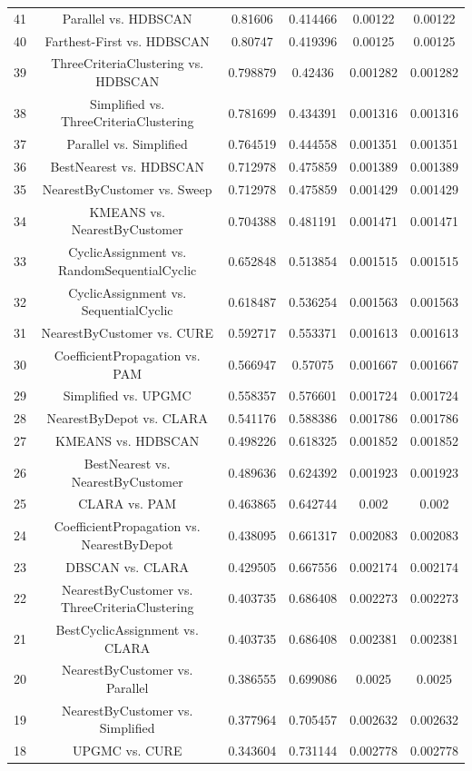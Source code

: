 \documentclass[a4paper,10pt]{article}
\begin{document}
\begin{landscape}
\begin{table}[!htp]
\begin{tabular}{cccccc}
41&Parallel vs. HDBSCAN&0.81606&0.414466&0.00122&0.00122\\
40&Farthest-First vs. HDBSCAN&0.80747&0.419396&0.00125&0.00125\\
39&ThreeCriteriaClustering vs. HDBSCAN&0.798879&0.42436&0.001282&0.001282\\
38&Simplified vs. ThreeCriteriaClustering&0.781699&0.434391&0.001316&0.001316\\
37&Parallel vs. Simplified&0.764519&0.444558&0.001351&0.001351\\
36&BestNearest vs. HDBSCAN&0.712978&0.475859&0.001389&0.001389\\
35&NearestByCustomer vs. Sweep&0.712978&0.475859&0.001429&0.001429\\
34&KMEANS vs. NearestByCustomer&0.704388&0.481191&0.001471&0.001471\\
33&CyclicAssignment vs. RandomSequentialCyclic&0.652848&0.513854&0.001515&0.001515\\
32&CyclicAssignment vs. SequentialCyclic&0.618487&0.536254&0.001563&0.001563\\
31&NearestByCustomer vs. CURE&0.592717&0.553371&0.001613&0.001613\\
30&CoefficientPropagation vs. PAM&0.566947&0.57075&0.001667&0.001667\\
29&Simplified vs. UPGMC&0.558357&0.576601&0.001724&0.001724\\
28&NearestByDepot vs. CLARA&0.541176&0.588386&0.001786&0.001786\\
27&KMEANS vs. HDBSCAN&0.498226&0.618325&0.001852&0.001852\\
26&BestNearest vs. NearestByCustomer&0.489636&0.624392&0.001923&0.001923\\
25&CLARA vs. PAM&0.463865&0.642744&0.002&0.002\\
24&CoefficientPropagation vs. NearestByDepot&0.438095&0.661317&0.002083&0.002083\\
23&DBSCAN vs. CLARA&0.429505&0.667556&0.002174&0.002174\\
22&NearestByCustomer vs. ThreeCriteriaClustering&0.403735&0.686408&0.002273&0.002273\\
21&BestCyclicAssignment vs. CLARA&0.403735&0.686408&0.002381&0.002381\\
20&NearestByCustomer vs. Parallel&0.386555&0.699086&0.0025&0.0025\\
19&NearestByCustomer vs. Simplified&0.377964&0.705457&0.002632&0.002632\\
18&UPGMC vs. CURE&0.343604&0.731144&0.002778&0.002778\\

\end{tabular}
\end{table}
\end{landscape}
\end{document}
